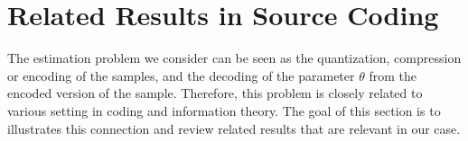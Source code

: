\documentclass[letterpaper, conference]{IEEEtran}      %
\begin{document}




\section{Related Results in Source Coding}
The estimation problem we consider can be seen as the quantization, compression or encoding of the samples, and the  decoding of the parameter $\theta$ from the encoded version of the sample. Therefore, this problem is closely related to various setting in coding and information theory. The goal of this section is to illustrates this connection and review related results that are relevant in our case. 


\end{document}
